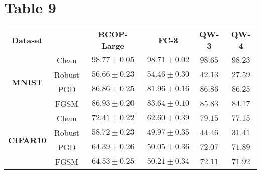 \documentclass{article}%
\begin{document}
%
\section*{Table 9}%
\label{sec:Table9}%
\begin{tabularx}{\textwidth}{c|c|cccc}%
\textbf{Dataset}&&\textbf{BCOP-Large}&\textbf{FC-3}&\textbf{QW-3}&\textbf{QW-4}\\%
\cmidrule{1-6}%
\multirow{4}{*}{\textbf{{MNIST}}}&Clean&$\mathbf{98.77}\pm0.05$&$98.71\pm0.02$&$98.65$&$98.23$\\%
&Robust&$\mathbf{56.66}\pm0.23$&$54.46\pm0.30$&$42.13$&$27.59$\\%
&PGD&$86.86\pm0.25$&$81.96\pm0.16$&$\mathbf{86.86}$&$86.25$\\%
&FGSM&$\mathbf{86.93}\pm0.20$&$83.64\pm0.10$&$85.83$&$84.17$\\%
\cmidrule{1-6}%
\multirow{4}{*}{\textbf{{CIFAR10}}}&Clean&$72.41\pm0.22$&$62.60\pm0.39$&$\mathbf{79.15}$&$77.15$\\%
&Robust&$\mathbf{58.72}\pm0.23$&$49.97\pm0.35$&$44.46$&$31.41$\\%
&PGD&$64.39\pm0.26$&$50.05\pm0.36$&$\mathbf{72.07}$&$71.89$\\%
&FGSM&$64.53\pm0.25$&$50.21\pm0.34$&$\mathbf{72.11}$&$71.92$\\%
\cmidrule{1-6}%
\end{tabularx}

%
\end{document}
